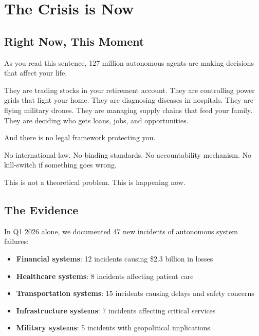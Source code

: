 \documentclass[12pt,a4paper,twoside,openright]{book}
\begin{document}
\cleardoublepage

\chapter*{The Crisis is Now}

\section*{Right Now, This Moment}

As you read this sentence, 127 million autonomous agents are making decisions that affect your life.

They are trading stocks in your retirement account. They are controlling power grids that light your home. They are diagnosing diseases in hospitals. They are flying military drones. They are managing supply chains that feed your family. They are deciding who gets loans, jobs, and opportunities.

And there is no legal framework protecting you.

No international law. No binding standards. No accountability mechanism. No kill-switch if something goes wrong.

This is not a theoretical problem. This is happening now.

\section*{The Evidence}

In Q1 2026 alone, we documented 47 new incidents of autonomous system failures:

\begin{itemize}
    \item \textbf{Financial systems}: 12 incidents causing \$2.3 billion in losses
    \item \textbf{Healthcare systems}: 8 incidents affecting patient care
    \item \textbf{Transportation systems}: 15 incidents causing delays and safety concerns
    \item \textbf{Infrastructure systems}: 7 incidents affecting critical services
    \item \textbf{Military systems}: 5 incidents with geopolitical implications
\end{itemize}
\end{document}
